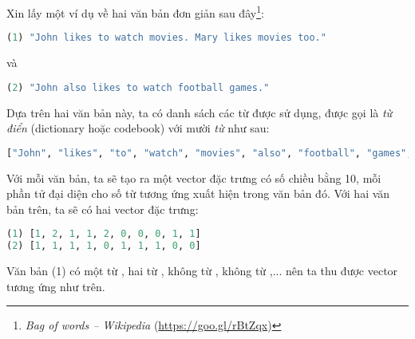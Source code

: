 {}
Xin lấy một ví dụ về hai văn bản đơn giản sau đây\footnote{\textit{Bag of
words -- Wikipedia} (\url{https://goo.gl/rBtZqx})}:

\begin{lstlisting}[language=Python]
(1) "John likes to watch movies. Mary likes movies too."
\end{lstlisting}
và
\begin{lstlisting}[language=Python]
(2) "John also likes to watch football games."
\end{lstlisting}
Dựa trên hai văn bản này, ta có danh sách các từ được sử dụng, được gọi là
\textit{từ điển} ({dictionary} hoặc {codebook}) với mười
\textit{từ} như sau:

\begin{lstlisting}[language=Python]
["John", "likes", "to", "watch", "movies", "also", "football", "games", "Mary", "too"]
\end{lstlisting}
Với mỗi văn bản, ta sẽ tạo ra một vector đặc trưng có số chiều bằng 10, mỗi phần
tử đại diện cho số từ tương ứng xuất hiện trong văn bản đó. Với hai văn bản
trên, ta sẽ có hai vector đặc trưng:
\begin{lstlisting}[language=Python]
(1) [1, 2, 1, 1, 2, 0, 0, 0, 1, 1]
(2) [1, 1, 1, 1, 0, 1, 1, 1, 0, 0]
\end{lstlisting}
Văn bản (1) có một từ , hai từ , không từ
, không từ ,... nên ta thu được
vector tương ứng như trên.

